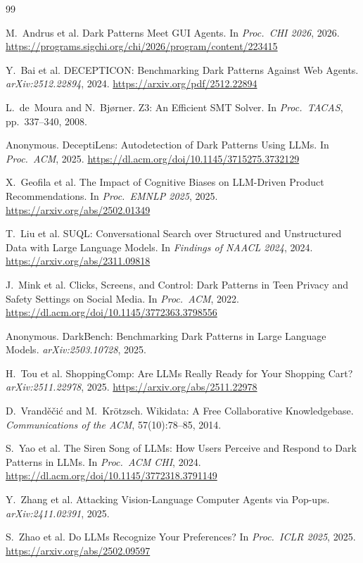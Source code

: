 \documentclass[11pt]{article}
\begin{document}
\clearpage

\begin{thebibliography}{99}

M.~Andrus et al.
\newblock Dark Patterns Meet GUI Agents.
\newblock In \textit{Proc.\ CHI 2026}, 2026.
\newblock \url{https://programs.sigchi.org/chi/2026/program/content/223415}

Y.~Bai et al.
\newblock DECEPTICON: Benchmarking Dark Patterns Against Web Agents.
\newblock \textit{arXiv:2512.22894}, 2024.
\newblock \url{https://arxiv.org/pdf/2512.22894}

L.~de~Moura and N.~Bj{\o}rner.
\newblock Z3: An Efficient SMT Solver.
\newblock In \textit{Proc.\ TACAS}, pp.~337--340, 2008.

Anonymous.
\newblock DeceptiLens: Autodetection of Dark Patterns Using LLMs.
\newblock In \textit{Proc.\ ACM}, 2025.
\newblock \url{https://dl.acm.org/doi/10.1145/3715275.3732129}

X.~Geofila et al.
\newblock The Impact of Cognitive Biases on LLM-Driven Product Recommendations.
\newblock In \textit{Proc.\ EMNLP 2025}, 2025.
\newblock \url{https://arxiv.org/abs/2502.01349}

T.~Liu et al.
\newblock SUQL: Conversational Search over Structured and Unstructured Data with Large Language Models.
\newblock In \textit{Findings of NAACL 2024}, 2024.
\newblock \url{https://arxiv.org/abs/2311.09818}

J.~Mink et al.
\newblock Clicks, Screens, and Control: Dark Patterns in Teen Privacy and Safety Settings on Social Media.
\newblock In \textit{Proc.\ ACM}, 2022.
\newblock \url{https://dl.acm.org/doi/10.1145/3772363.3798556}

Anonymous.
\newblock DarkBench: Benchmarking Dark Patterns in Large Language Models.
\newblock \textit{arXiv:2503.10728}, 2025.

H.~Tou et al.
\newblock ShoppingComp: Are LLMs Really Ready for Your Shopping Cart?
\newblock \textit{arXiv:2511.22978}, 2025.
\newblock \url{https://arxiv.org/abs/2511.22978}

D.~Vrand\v{e}\v{c}i\'{c} and M.~Kr\"{o}tzsch.
\newblock Wikidata: A Free Collaborative Knowledgebase.
\newblock \textit{Communications of the ACM}, 57(10):78--85, 2014.

S.~Yao et al.
\newblock The Siren Song of LLMs: How Users Perceive and Respond to Dark Patterns in LLMs.
\newblock In \textit{Proc.\ ACM CHI}, 2024.
\newblock \url{https://dl.acm.org/doi/10.1145/3772318.3791149}

Y.~Zhang et al.
\newblock Attacking Vision-Language Computer Agents via Pop-ups.
\newblock \textit{arXiv:2411.02391}, 2025.

S.~Zhao et al.
\newblock Do LLMs Recognize Your Preferences?
\newblock In \textit{Proc.\ ICLR 2025}, 2025.
\newblock \url{https://arxiv.org/abs/2502.09597}

\end{thebibliography}
\end{document}
